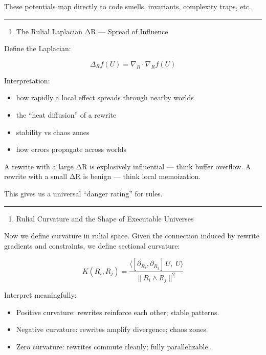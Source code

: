 These potentials map directly to code smells, invariants, complexity
traps, etc.

\begin{center}\rule{0.5\linewidth}{0.5pt}\end{center}

\begin{enumerate}
\def\labelenumi{\arabic{enumi}.}
\setcounter{enumi}{4}
\tightlist
\item
  The Rulial Laplacian ΔR --- Spread of Influence
\end{enumerate}

Define the Laplacian:

\[
\Delta_R f(U) = \nabla_R \cdot \nabla_R f(U)
\]

Interpretation:
\begin{itemize}[nosep]
  \item how rapidly a local effect spreads through nearby worlds
  \item the ``heat diffusion'' of a rewrite
  \item stability vs chaos zones
  \item how errors propagate across worlds
\end{itemize}

A rewrite with a large ΔR is explosively influential --- think buffer
overflow. A rewrite with a small ΔR is benign --- think local
memoization.

This gives us a universal ``danger rating'' for rules.

\begin{center}\rule{0.5\linewidth}{0.5pt}\end{center}

\begin{enumerate}
\def\labelenumi{\arabic{enumi}.}
\setcounter{enumi}{5}
\tightlist
\item
  Rulial Curvature and the Shape of Executable Universes
\end{enumerate}

Now we define curvature in rulial space. Given the connection induced by
rewrite gradients and constraints, we define sectional curvature:

\[
K(R_i, R_j) =
\frac{\langle [\partial_{R_i}, \partial_{R_j}]\,U,\; U\rangle}{\|R_i \wedge R_j\|^2}
\]

Interpret meaningfully:
\begin{itemize}[nosep]
  \item Positive curvature: rewrites reinforce each other; stable patterns.
  \item Negative curvature: rewrites amplify divergence; chaos zones.
  \item Zero curvature: rewrites commute cleanly; fully parallelizable.
\end{itemize}

